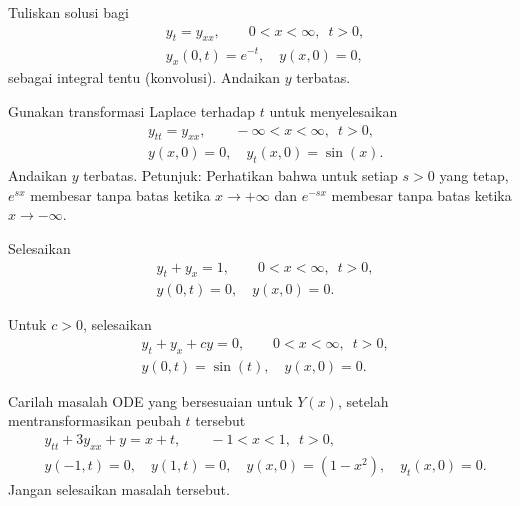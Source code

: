 \begin{exercise}
Tuliskan solusi bagi
\begin{align*}
& y_t = y_{xx}, \qquad 0 < x < \infty, \enspace t > 0,\\
& y_x(0,t) = e^{-t}, \quad y(x,0) = 0 ,
\end{align*}
sebagai integral tentu (konvolusi).  Andaikan $y$ terbatas.
\end{exercise}

\begin{exercise}
Gunakan transformasi Laplace terhadap $t$ untuk menyelesaikan
\begin{align*}
& y_{tt} = y_{xx}, \qquad -\infty < x < \infty, \enspace t > 0,\\
& y(x,0) = 0, \quad y_t(x,0) = \sin(x) .
\end{align*}
Andaikan $y$ terbatas.
Petunjuk: Perhatikan bahwa untuk setiap $s > 0$ yang tetap,
$e^{sx}$ membesar tanpa batas ketika $x \to +\infty$
dan
$e^{-sx}$ membesar tanpa batas ketika $x \to -\infty$.
\end{exercise}

\setcounter{exercise}{100}

\begin{exercise}
Selesaikan
\begin{align*}
& y_t + y_x = 1, \qquad 0 < x < \infty, \enspace t > 0,
\\
& y(0,t) = 0, \quad y(x,0) = 0 .
\end{align*}
\end{exercise}

\begin{exercise}
Untuk $c > 0$, selesaikan
\begin{align*}
& y_t + y_x + c y = 0, \qquad 0 < x < \infty, \enspace t > 0,
\\
& y(0,t) = \sin(t), \quad y(x,0) = 0 .
\end{align*}
\end{exercise}

\begin{exercise}
Carilah masalah ODE yang bersesuaian untuk $Y(x)$, setelah mentransformasikan peubah $t$
tersebut
\begin{align*}
& y_{tt} + 3y_{xx} + y = x+t, \qquad -1 < x < 1, \enspace t > 0,
\\
& y(-1,t) = 0, \quad y(1,t) = 0, \quad y(x,0) = (1-x^2) , \quad y_t(x,0) = 0.
\end{align*}
Jangan selesaikan masalah tersebut.
\end{exercise}

